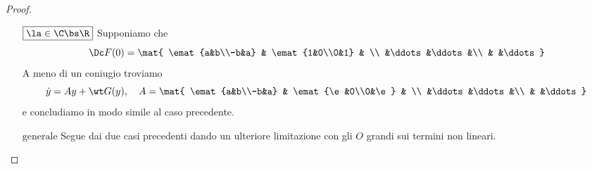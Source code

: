 \begin{proof}
\begin{itemize}
        Poich\'e $\la<0$ \`e lecito fissare $\e\in(0,\abs\la)$. Per le propriet\`a degli $O$ grandi esistono $r,C>0$ tali che
        \[\norm y<r\implies \dot V(y)\leq((\la+\e)+C\norm y)\norm y^2.\]
        Ponendo ora $\la+\e+C\norm y<0$ si ha che se 
        \[r'<\min\cpa{r,\frac{\abs{\la+\e}}{C}}\]
        allora per $y\in B_{r'}(0)\bs\cpa0$ vale
        \[\dot V(y)\leq ((\la+\e)+C\norm y)\norm y^2<0,\]
        cio\`e $V$ \`e una funzione di Lyapunov stretta per $x_0$ in un opportuno cambio di base, dunque $x_0$ \`e asintoticamente stabile per il secondo teorema di Lyapunov (\ref{TeoremaLyapunov2AsintoticaStabilita}).
        \item[$\boxed{\la\in\C\bs \R}$] Supponiamo che
        \[\Dc F(0)=\mat{
        \emat{a&b\\-b&a} & \emat{1&0\\0&1}     &      \\
            &\ddots &\ddots&\\
            &       &\ddots
        }\]
        A meno di un coniugio troviamo
        \[\dot y=Ay+\wt G(y),\quad A=\mat{
        \emat{a&b\\-b&a} & \emat{\e&0\\0&\e}     &      \\
            &\ddots &\ddots&\\
            &       &\ddots
        }\]
        e concludiamo in modo simile al caso precedente.
        \item[$\boxed{\text{generale}}$] Segue dai due casi precedenti dando un ulteriore limitazione con gli $O$ grandi sui termini non lineari.
    \end{itemize}
    \setlength{\leftmargini}{0.5cm}
\end{proof}

